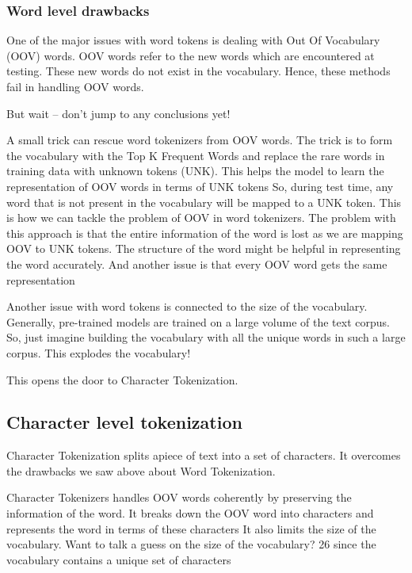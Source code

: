 \subsubsection{Word level drawbacks}

One of the major issues with word tokens is dealing with Out Of Vocabulary (OOV) words. OOV words refer to the new words which are encountered at testing. These new words do not exist in the vocabulary. Hence, these methods fail in handling OOV words.

But wait – don’t jump to any conclusions yet!

    A small trick can rescue word tokenizers from OOV words. The trick is to form the vocabulary with the Top K Frequent Words and replace the rare words in training data with unknown tokens (UNK). This helps the model to learn the representation of OOV words in terms of UNK tokens
    So, during test time, any word that is not present in the vocabulary will be mapped to a UNK token. This is how we can tackle the problem of OOV in word tokenizers.
    The problem with this approach is that the entire information of the word is lost as we are mapping OOV to UNK tokens. The structure of the word might be helpful in representing the word accurately. And another issue is that every OOV word gets the same representation

Another issue with word tokens is connected to the size of the vocabulary. Generally, pre-trained models are trained on a large volume of the text corpus. So, just imagine building the vocabulary with all the unique words in such a large corpus. This explodes the vocabulary!

This opens the door to Character Tokenization.
    
\subsection{Character level tokenization}

Character Tokenization splits apiece of text into a set of characters. It overcomes the drawbacks we saw above about Word Tokenization.

    Character Tokenizers handles OOV words coherently by preserving the information of the word. It breaks down the OOV word into characters and represents the word in terms of these characters
    It also limits the size of the vocabulary. Want to talk a guess on the size of the vocabulary? 26 since the vocabulary contains a unique set of characters

